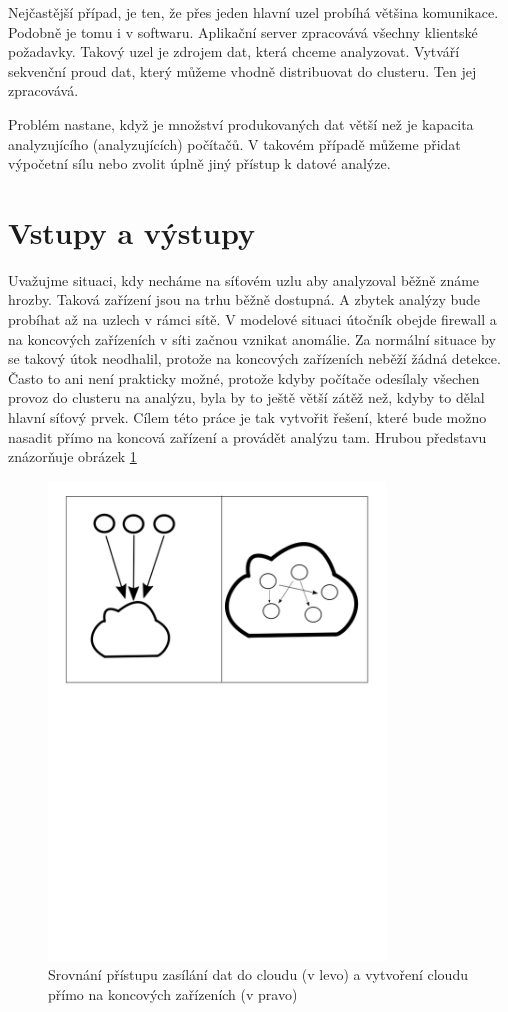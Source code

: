 \documentclass[
  digital, %
  table,   %
  nolof,     %
  nolot,     %
  twoside, %
  nocover,
  monochrome,
  12pt
]{fithesis3}
\begin{document}
Nejčastější případ, je ten, že přes jeden hlavní uzel probíhá většina komunikace. Podobně je tomu i v softwaru. Aplikační server zpracovává všechny klientské požadavky. Takový uzel je zdrojem dat, která chceme analyzovat. Vytváří sekvenční proud dat, který můžeme vhodně distribuovat do clusteru. Ten jej zpracovává.

Problém nastane, když je množství produkovaných dat větší než je kapacita analyzujícího (analyzujících) počítačů. V takovém případě můžeme přidat výpočetní sílu nebo zvolit úplně jiný přístup k datové analýze.

\section{Vstupy a výstupy}
Uvažujme situaci, kdy necháme na síťovém uzlu aby analyzoval běžně známe hrozby. Taková zařízení jsou na trhu běžně dostupná. A zbytek analýzy bude probíhat až na uzlech v rámci sítě. V modelové situaci útočník obejde firewall a na koncových zařízeních v síti začnou vznikat anomálie. Za normální situace by se takový útok neodhalil, protože na koncových zařízeních neběží žádná detekce. Často to ani není prakticky možné, protože kdyby počítače odesílaly všechen provoz do clusteru na analýzu, byla by to ještě větší zátěž než, kdyby to dělal hlavní síťový prvek. Cílem této práce je tak vytvořit řešení, které bude možno nasadit přímo na koncová zařízení a provádět analýzu tam. Hrubou představu znázorňuje obrázek \ref{fig:cloud-comparison}

\begin{figure}[H]
	\centering
    \includegraphics[width=0.8\textwidth, height=0.55\textheight]{images/cloud-comparison.png}
    \caption{Srovnání přístupu zasílání dat do cloudu (v levo) a vytvoření cloudu přímo na koncových zařízeních (v pravo)}
    \label{fig:cloud-comparison}
\end{figure}
\end{document}
